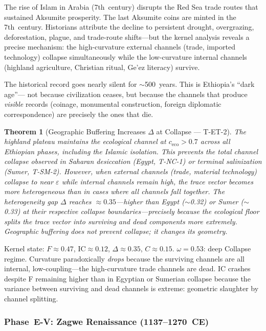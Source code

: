 \documentclass[
  aps,
  prd,
  twocolumn,
  superscriptaddress,
  nofootinbib,
  floatfix
]{revtex4-2}
\newtheorem{theorem}{Theorem}
\newcommand{\eps}{\varepsilon}
\newcommand{\IC}{\mathrm{IC}}
\begin{document}
The rise of Islam in Arabia (7th~century) disrupts the Red Sea trade
routes that sustained Aksumite prosperity.  The last
Aksumite coins are minted in the 7th~century.
Historians attribute the decline to persistent
drought, overgrazing, deforestation, plague, and
trade-route shifts---but the kernel analysis reveals
a precise mechanism: the high-curvature external
channels (trade, imported technology) collapse
simultaneously while the low-curvature internal
channels (highland agriculture, Christian ritual,
Ge'ez literacy) survive.

The historical record goes nearly silent for
$\sim$500~years.  This is Ethiopia's ``dark age''---
not because civilization ceases, but because the
channels that produce \emph{visible} records (coinage,
monumental construction, foreign diplomatic
correspondence) are precisely the ones that die.

\begin{theorem}[Geographic Buffering Increases
$\Delta$ at Collapse --- T-ET-2]\label{thm:buffer}
The highland plateau maintains the ecological channel
at $c_{\mathrm{eco}} > 0.7$ across all Ethiopian
phases, including the Islamic isolation.  This
prevents the total channel collapse observed in
Saharan desiccation (Egypt, T-NC-1) or terminal
salinization (Sumer, T-SM-2).  However, when
external channels (trade, material technology)
collapse to near $\eps$ while internal channels
remain high, the trace vector becomes \emph{more}
heterogeneous than in cases where all channels fall
together.  The heterogeneity gap $\Delta$ reaches
$\approx 0.35$---\emph{higher} than Egypt
($\sim$0.32) or Sumer ($\sim$0.33) at their
respective collapse boundaries---precisely because
the ecological floor splits the trace vector into
surviving and dead components more extremely.
Geographic buffering does not prevent collapse; it
changes its geometry.
\end{theorem}

Kernel state: $F \approx 0.47$, $\IC \approx 0.12$,
$\Delta \approx 0.35$, $C \approx 0.15$.
$\omega = 0.53$: deep Collapse regime.  Curvature
paradoxically \emph{drops} because the surviving
channels are all internal, low-coupling---the
high-curvature trade channels are dead.  IC crashes
despite F remaining higher than in Egyptian or
Sumerian collapse because the variance between
surviving and dead channels is extreme: geometric
slaughter by channel splitting.

\subsubsection{Phase~E-V: Zagwe Renaissance
(1137--1270~CE)}\label{sec:zagwe}
\end{document}

